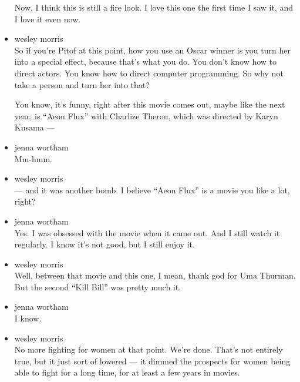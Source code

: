 \begin{itemize}
  Now, I think this is still a fire look. I love this one the first time
  I saw it, and I love it even now.
\item
  wesley morris\\
  So if you're Pitof at this point, how you use an Oscar winner is you
  turn her into a special effect, because that's what you do. You don't
  know how to direct actors. You know how to direct computer
  programming. So why not take a person and turn her into that?

  You know, it's funny, right after this movie comes out, maybe like the
  next year, is ``Aeon Flux'' with Charlize Theron, which was directed
  by Karyn Kusama ---
\item
  jenna wortham\\
  Mm-hmm.
\item
  wesley morris\\
  --- and it was another bomb. I believe ``Aeon Flux'' is a movie you
  like a lot, right?
\item
  jenna wortham\\
  Yes. I was obsessed with the movie when it came out. And I still watch
  it regularly. I know it's not good, but I still enjoy it.
\item
  wesley morris\\
  Well, between that movie and this one, I mean, thank god for Uma
  Thurman. But the second ``Kill Bill'' was pretty much it.
\item
  jenna wortham\\
  I know.
\item
  wesley morris\\
  No more fighting for women at that point. We're done. That's not
  entirely true, but it just sort of lowered --- it dimmed the prospects
  for women being able to fight for a long time, for at least a few
  years in movies.


\end{itemize}
